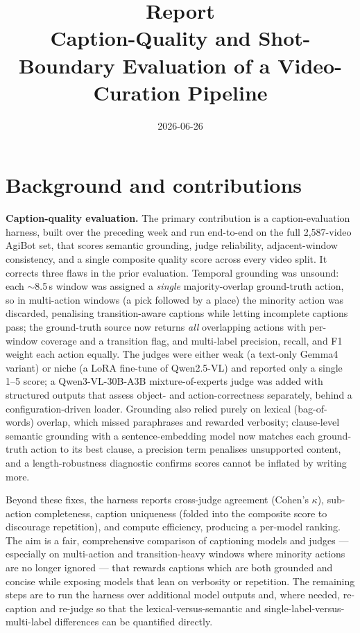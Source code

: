 \documentclass[10pt,letterpaper]{article}
\title{\textbf{Report}\\[0.2cm]
\large Caption-Quality and Shot-Boundary Evaluation of a Video-Curation Pipeline}
\author{}
\date{2026-06-26}
\begin{document}
\maketitle

\section{Background and contributions}

\textbf{Caption-quality evaluation.} The primary contribution is a caption-evaluation harness,
built over the preceding week and run end-to-end on the full 2{,}587-video AgiBot set, that scores
semantic grounding, judge reliability, adjacent-window consistency, and a single composite quality
score across every video split. It corrects three flaws in the prior evaluation. Temporal
grounding was unsound: each $\sim$8.5\,s window was assigned a \emph{single} majority-overlap
ground-truth action, so in multi-action windows (a pick followed by a place) the minority action
was discarded, penalising transition-aware captions while letting incomplete captions pass; the
ground-truth source now returns \emph{all} overlapping actions with per-window coverage and a
transition flag, and multi-label precision, recall, and F1 weight each action equally. The judges
were either weak (a text-only Gemma4 variant) or niche (a LoRA fine-tune of Qwen2.5-VL) and
reported only a single 1--5 score; a Qwen3-VL-30B-A3B mixture-of-experts judge was added with
structured outputs that assess object- and action-correctness separately, behind a
configuration-driven loader. Grounding also relied purely on lexical (bag-of-words) overlap, which
missed paraphrases and rewarded verbosity; clause-level semantic grounding with a sentence-embedding
model now matches each ground-truth action to its best clause, a precision term penalises
unsupported content, and a length-robustness diagnostic confirms scores cannot be inflated by
writing more.

Beyond these fixes, the harness reports cross-judge agreement (Cohen's $\kappa$), sub-action
completeness, caption uniqueness (folded into the composite score to discourage repetition), and
compute efficiency, producing a per-model ranking. The aim is a fair, comprehensive comparison of
captioning models and judges --- especially on multi-action and transition-heavy windows where
minority actions are no longer ignored --- that rewards captions which are both grounded and concise
while exposing models that lean on verbosity or repetition. The remaining steps are to run the
harness over additional model outputs and, where needed, re-caption and re-judge so that the
lexical-versus-semantic and single-label-versus-multi-label differences can be quantified directly.
\end{document}

